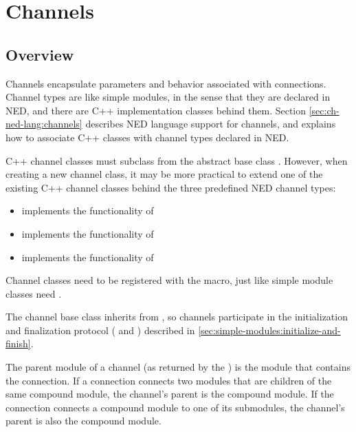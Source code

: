 \section{Channels}
\label{sec:simple-modules:channels}

\subsection{Overview}

Channels encapsulate parameters and behavior associated with connections.
Channel types are like simple modules, in the sense that they are declared
in NED, and there are C++ implementation classes behind them. Section
\ref{sec:ch-ned-lang:channels} describes NED language support for channels,
and explains how to associate C++ classes with channel types declared in
NED.

C++ channel classes must subclass from the abstract base class
. However, when creating a new channel class, it may be
more practical to extend one of the existing C++ channel classes behind the
three predefined NED channel types:

\begin{itemize}
  \item {} implements the functionality of 
  \item {} implements the functionality of 
  \item {} implements the functionality of 
\end{itemize}

Channel classes need to be registered with the  macro,
just like simple module classes need .

The channel base class  inherits from ,
so channels participate in the initialization and finalization protocol
( and ) described in
\ref{sec:simple-modules:initialize-and-finish}.

The parent module of a channel (as returned by the
) is the module that contains
the connection. If a connection connects two modules that are children of
the same compound module, the channel's parent is the compound module. If
the connection connects a compound module to one of its submodules, the
channel's parent is also the compound module.


